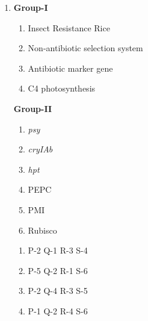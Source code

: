 \documentclass[journal,12pt,onecolumn]{IEEEtran}
\begin{document}
\begin{enumerate}
\begin{multicols}{2}
\columnbreak

\textbf{Group-II}
\begin{enumerate}[label=\arabic*.]
    \item \textit{Synchytrium endobioticum}
    \item \textit{Rhizoctonia solani}
    \item \textit{Alternaria solani}
    \item \textit{Phytophthora colocasiae}
    \item \textit{Phytophthora arecaecae}
    \item \textit{Phytophthora infestans}
\end{enumerate}
\end{multicols}

\begin{multicols}{2}
\begin{enumerate}[label=(\Alph*)]
    \item P-6 Q-3 R-2 S-1
    \item P-6 Q-3 R-2 S-2
    \item P-5 Q-3 R-2 S-1
    \item P-4 Q-3 R-2 S-1
\end{enumerate}
\end{multicols}
\item
\begin{multicols}{2}
\textbf{Group-I}
\begin{enumerate}[label=(\Alph*) ,start=16]
    \item Insect Resistance Rice
    \item Non-antibiotic selection system
    \item Antibiotic marker gene
    \item C4 photosynthesis
\end{enumerate}

\columnbreak

\textbf{Group-II}
\begin{enumerate}[label=\arabic*.]
    \item \textit{psy}
    \item \textit{cryIAb}
    \item \textit{hpt}
    \item PEPC
    \item PMI
    \item Rubisco
\end{enumerate}
\end{multicols}

\begin{multicols}{2}
\begin{enumerate}[label=(\Alph*)]
    \item P-2 Q-1 R-3 S-4
    \item P-5 Q-2 R-1 S-6
    \item P-2 Q-4 R-3 S-5
    \item P-1 Q-2 R-4 S-6
\end{enumerate}
\end{multicols}


\end{enumerate}
\end{document}
